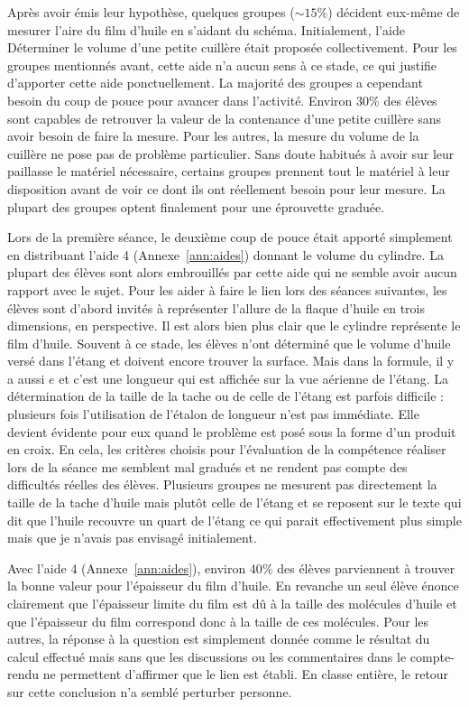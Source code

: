 \documentclass[12pt,a4paper]{article}
\begin{document}
Après avoir émis leur hypothèse, quelques groupes ($\sim \unit{15}{\%}$) décident eux-même de mesurer l'aire du film d'huile en s'aidant du schéma.
Initialement, l'aide \og Déterminer le volume d'une petite cuillère \fg{} était proposée collectivement.
Pour les groupes mentionnés avant, cette aide n'a aucun sens à ce stade, ce qui justifie d'apporter cette aide ponctuellement.
La majorité des groupes a cependant besoin du coup de pouce pour avancer dans l'activité.
Environ \unit{30}{\%} des élèves sont capables de retrouver la valeur de la contenance d'une petite cuillère sans avoir besoin de faire la mesure.
Pour les autres, la mesure du volume de la cuillère ne pose pas de problème particulier.
Sans doute habitués à avoir sur leur paillasse le matériel nécessaire, certains groupes prennent tout le matériel à leur disposition avant de voir ce dont ils ont réellement besoin pour leur mesure.
La plupart des groupes optent finalement pour une éprouvette graduée.

Lors de la première séance, le deuxième coup de pouce était apporté simplement en distribuant l'aide 4 (Annexe~\ref{ann:aides}) donnant le volume du cylindre.
La plupart des élèves sont alors embrouillés par cette aide qui ne semble avoir aucun rapport avec le sujet.
Pour les aider à faire le lien lors des séances suivantes, les élèves sont d'abord invités à représenter l'allure de la flaque d'huile en trois dimensions, en perspective.
Il est alors bien plus clair que le cylindre représente le film d'huile.
Souvent à ce stade, les élèves n'ont déterminé que le volume d'huile versé dans l'étang et doivent encore trouver la surface.
Mais dans la formule, il y a aussi $e$ et c'est une longueur qui est affichée sur la vue aérienne de l'étang.
La détermination de la taille de la tache ou de celle de l'étang est parfois difficile : plusieurs fois l'utilisation de l'étalon de longueur n'est pas immédiate.
Elle devient évidente pour eux quand le problème est posé sous la forme d'un produit en croix.
En cela, les critères choisis pour l'évaluation de la compétence réaliser lors de la séance me semblent mal gradués et ne rendent pas compte des difficultés réelles des élèves.
Plusieurs groupes ne mesurent pas directement la taille de la tache d'huile mais plutôt celle de l'étang et se reposent sur le texte qui dit que l'huile recouvre un quart de l'étang ce qui parait effectivement plus simple mais que je n'avais pas envisagé initialement.

Avec l'aide 4 (Annexe~\ref{ann:aides}), environ \unit{40}{\%} des élèves parviennent à trouver la bonne valeur pour l'épaisseur du film d'huile.
En revanche un seul élève énonce clairement que l'épaisseur limite du film est dû à la taille des molécules d'huile et que l'épaisseur du film correspond donc à la taille de ces molécules.
Pour les autres, la réponse à la question est simplement donnée comme le résultat du calcul effectué mais sans que les discussions ou les commentaires dans le compte-rendu ne permettent d'affirmer que le lien est établi. 
En classe entière, le retour sur cette conclusion n'a semblé perturber personne.
\end{document}
